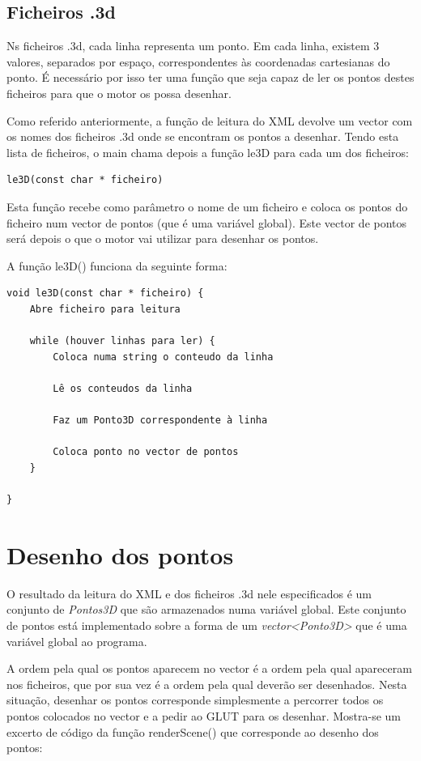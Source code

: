 \subsection{Ficheiros .3d}


Ns ficheiros .3d, cada linha representa um ponto. Em cada linha, existem 3 valores, separados por espaço, correspondentes às coordenadas cartesianas do ponto. É necessário por isso ter uma função que seja capaz de ler os pontos destes ficheiros para que o motor os possa desenhar.

Como referido anteriormente, a função de leitura do XML devolve um vector com os nomes dos ficheiros .3d onde se encontram os pontos a desenhar. Tendo esta lista de ficheiros, o main chama depois a função le3D para cada um dos ficheiros:

\begin{Verbatim}
le3D(const char * ficheiro)
\end{Verbatim}

Esta função recebe como parâmetro o nome de um ficheiro e coloca os pontos do ficheiro num vector de pontos (que é uma variável global). Este vector de pontos será depois o que o motor vai utilizar para desenhar os pontos.

A função le3D() funciona da seguinte forma:

\begin{Verbatim}
void le3D(const char * ficheiro) {
	Abre ficheiro para leitura
	
	while (houver linhas para ler) {
		Coloca numa string o conteudo da linha
		
		Lê os conteudos da linha
		
		Faz um Ponto3D correspondente à linha
		
		Coloca ponto no vector de pontos
	}
	
}
\end{Verbatim}

\section{Desenho dos pontos}

O resultado da leitura do XML e dos ficheiros .3d nele especificados é um conjunto de \textit{Pontos3D} que são armazenados numa variável global. Este conjunto de pontos está implementado sobre a forma de um \textit{vector<Ponto3D>} que é uma variável global ao programa.

A ordem pela qual os pontos aparecem no vector é a ordem pela qual apareceram nos ficheiros, que por sua vez é a ordem pela qual deverão ser desenhados. Nesta situação, desenhar os pontos corresponde simplesmente a percorrer todos os pontos colocados no vector e a pedir ao GLUT para os desenhar. Mostra-se um excerto de código da função renderScene() que corresponde ao desenho dos pontos:

